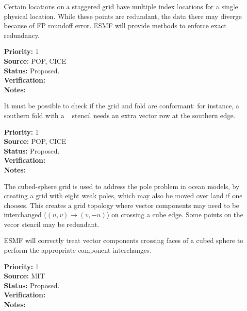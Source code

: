 Certain locations on a staggered grid have multiple index locations
for a single physical location. While these points are redundant, the
data there may diverge because of FP roundoff error. ESMF will provide
methods to enforce exact redundancy.

\begin{reqlist}
{\bf Priority:} 1 \\ 
{\bf Source:} POP, CICE \\
{\bf Status:} Proposed. \\
{\bf Verification:} \\
{\bf Notes:}
\end{reqlist}


It must be possible to check if the grid and fold are conformant:
for instance, a southern fold with a \bgrid~ stencil needs an extra
vector row at the southern edge.

\begin{reqlist}
{\bf Priority:} 1 \\ 
{\bf Source:} POP, CICE \\
{\bf Status:} Proposed. \\
{\bf Verification:} \\
{\bf Notes:}
\end{reqlist}


The cubed-sphere grid \cite{ref:rpm1996} is used to address the pole
problem in ocean models, by creating a grid with eight weak poles,
which may also be moved over land if one chooses. This creates a grid
topology where vector components may need to be interchanged
($(u,v)\longrightarrow(v,-u)$) on crossing a cube edge. Some points on
the vecor stencil may be redundant.


ESMF will correctly treat vector components crossing faces of a cubed
sphere to perform the appropriate component interchanges.

\begin{reqlist}
{\bf Priority:} 1 \\ 
{\bf Source:} MIT \\
{\bf Status:} Proposed. \\
{\bf Verification:} \\
{\bf Notes:}
\end{reqlist}


